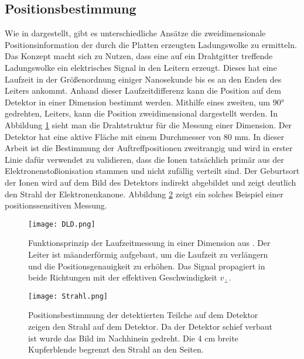 \subsection{Positionsbestimmung}
Wie in \cite{Detektorsystem} dargestellt, gibt es unterschiedliche Ansätze die zweidimensionale Positionsinformation der durch die Platten erzeugten Ladungswolke zu ermitteln. Das Konzept macht sich zu Nutzen, dass eine auf ein Drahtgitter treffende Ladungswolke ein elektrisches Signal in den Leitern erzeugt. Dieses hat eine Laufzeit in der Größenordnung einiger Nanosekunde bis es an den Enden des Leiters ankommt. Anhand dieser Laufzeitdifferenz kann die Position auf dem Detektor in einer Dimension bestimmt werden. Mithilfe eines zweiten, um \ang{90} gedrehten, Leiters, kann die Position zweidimensional dargestellt werden. In Abbildung \ref{fig:DLD} sieht man die Drahtstruktur für die Messung einer Dimension. Der Detektor hat eine aktive Fläche mit einem Durchmesser von 80 mm. In dieser Arbeit ist die Bestimmung der Auftreffpositionen zweitrangig und wird in erster Linie dafür verwendet zu validieren, dass die Ionen tatsächlich primär aus der Elektronenstoßionisation stammen und nicht zufällig verteilt sind. Der Geburtsort der Ionen wird auf dem Bild des Detektors indirekt abgebildet und zeigt deutlich den Strahl der Elektronenkanone. Abbildung \ref{fig:Strahl} zeigt ein solches Beispiel einer positionssensitiven Messung.

\begin{figure}
    \centering
    \texttt{[image: DLD.png]}
    \caption[Funktionsprinzip der Laufzeitmessung des Detektors]{Funktionsprinzip der Laufzeitmessung in einer Dimension aus \cite{Detektorsystem}. Der Leiter ist mäanderförmig aufgebaut, um die Laufzeit zu verlängern und die Positionsgenauigkeit zu erhöhen. Das Signal propagiert in beide Richtungen mit der effektiven Geschwindigkeit $v_\perp$.}
    \label{fig:DLD} 
\end{figure}

\begin{figure}
    \centering
    \texttt{[image: Strahl.png]}
    \caption[Abbild des Strahls auf dem Detektor]{Positionsbestimmung der detektierten Teilche auf dem Detektor zeigen den Strahl auf dem Detektor. Da der Detektor schief verbaut ist wurde das Bild im Nachhinein gedreht. Die 4 cm breite Kupferblende begrenzt den Strahl an den Seiten.}
    \label{fig:Strahl} 
\end{figure}

